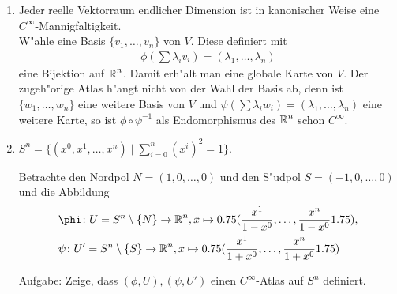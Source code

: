 \begin{bsp}
\begin{enumerate}[leftmargin=*,label=\arabic*)]
  \item Jeder reelle Vektorraum endlicher Dimension ist in kanonischer Weise eine $C^{\infty}$-Mannigfaltigkeit.\\
    W"ahle eine Basis $\{v_1, \ldots, v_n\}$ von $V$. Diese definiert mit
    \begin{align*}
      \phi\left(\sum\lambda_iv_i\right) = (\lambda_1, \ldots, \lambda_n)
    \end{align*}
    eine Bijektion auf $\operatorname{\mathbb{R}}^n$. Damit erh"alt man eine globale Karte von $V$.
    Der zugeh"orige Atlas h"angt nicht von der Wahl der Basis ab, denn ist $\{w_1, \ldots, w_n\}$ eine weitere Basis von $V$ und $\psi(\sum \lambda_iw_i) = (\lambda_1, \ldots, \lambda_n)$ eine weitere Karte, so ist $\phi \circ \psi^{-1}$ als \gls{Endomorphismus} des $\operatorname{\mathbb{R}}^n$ schon $C^{\infty}$.

  \item $S^n = \{(x^0, x^1, \ldots, x^n) \mid \sum_{i = 0}^n(x^{i})^2 = 1\}$.\\

    
    Betrachte den Nordpol $N = (1,0,\ldots,0)$ und den S"udpol $S = (-1,0,\ldots,0)$ und die Abbildung
    \begin{align*}
      & \phi \colon U = S^{n}\setminus\{N\} \to \R^n, x \mapsto \left(\frac{x^1}{1-x^0}, \ldots, \frac{x^{n}}{1-x^0}\right),\\
      & \psi \colon U' = S^{n} \setminus \{S\} \to \R^n, x \mapsto \left(\frac{x^1}{1+x^0}, \ldots, \frac{x^n}{1+x^0}\right)
    \end{align*}

    Aufgabe: Zeige, dass $(\phi, U), (\psi, U')$ einen $C^{\infty}$-Atlas auf $S^n$ definiert.

  \end{enumerate}
\end{bsp}

